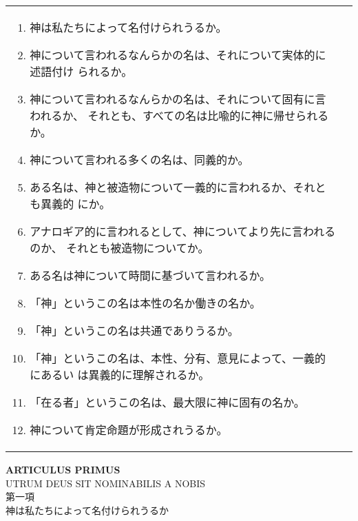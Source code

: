 \documentclass[paper=a4paper,fontsize=10pt,jafontsize=9pt,titlepage]{jlreq}
\begin{document}
\begin{longtable}{p{21em}p{21em}}
\vspace{1.3em}
\begin{enumerate}
 \item 神は私たちによって名付けられうるか。
 \item 神について言われるなんらかの名は、それについて実体的に述語付け
 られるか。
 \item 神について言われるなんらかの名は、それについて固有に言われるか、
       それとも、すべての名は比喩的に神に帰せられるか。
 \item 神について言われる多くの名は、同義的か。
 \item ある名は、神と被造物について一義的に言われるか、それとも異義的
 にか。
 \item アナロギア的に言われるとして、神についてより先に言われるのか、
 それとも被造物についてか。
 \item ある名は神について時間に基づいて言われるか。
 \item 「神」というこの名は本性の名か働きの名か。
 \item 「神」というこの名は共通でありうるか。
 \item 「神」というこの名は、本性、分有、意見によって、一義的にあるい
 は異義的に理解されるか。
 \item 「在る者」というこの名は、最大限に神に固有の名か。
 \item 神について肯定命題が形成されうるか。
\end{enumerate}
\end{longtable}

\newpage
{}
\begin{center}
{\Large {\bfseries ARTICULUS PRIMUS}\\UTRUM DEUS SIT NOMINABILIS A NOBIS}\\
{\large 第一項\\神は私たちによって名付けられうるか}
\end{center}
\end{document}
